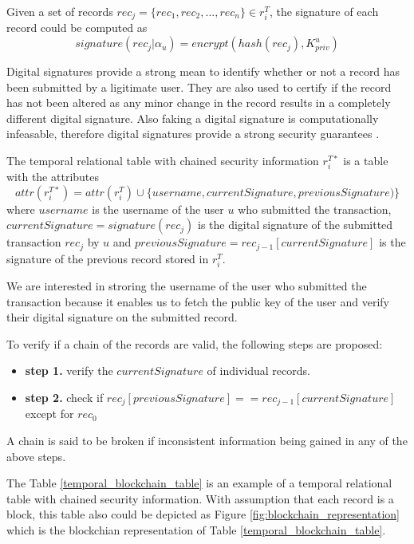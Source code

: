 \begin{defn} 
	Given a set of records $rec_j =\{rec_1,rec_2,...,rec_n\} \in r_i^T$, the signature of each record could be computed as $$signature(rec_j|\alpha_u)= encrypt(hash(rec_j),K_{priv}^u)$$  
\label{defn:digital_signature}
\end{defn}

Digital signatures provide a strong mean to identify whether or not a record has been submitted by a ligitimate user. They are also used to certify if the record has not been altered as any minor change in the record results in a completely different digital signature. Also faking a digital signature is computationally infeasable, therefore digital signatures provide a strong security guarantees \cite{katz2010digital}.

\begin{defn}
	The temporal relational table with chained security information $r_i^{T*}$ is a table with the attributes $$attr(r_i^{T*}) = attr(r_i^T) \cup \{username,currentSignature, previousSignature)\}$$ where $username$ is the username of the user $u$ who submitted the transaction, $currentSignature = signature(rec_j)$ is the digital signature of the submitted transaction $rec_j$ by $u$ and $previousSignature = rec_{j-1}[currentSignature]$ is the signature of the previous record stored in $r_i^T$. 
\label{defn:temporal_blockchain}
\end{defn}

We are interested in stroring the username of the user who submitted the transaction because it enables us to fetch the public key of the user and verify their digital signature on the submitted record.

\begin{defn}
	To verify if a chain of the records are valid, the following steps are proposed:
	\begin{itemize}
		\item \textbf{step 1.} verify the $currentSignature$ of individual records.
		\item \textbf{step 2.} check if $rec_j[previousSignature] == rec_{j-1}[currentSignature]$ except for $rec_0$
	\end{itemize}
\label{chain_verification}
\end{defn}
A chain is said to be broken if inconsistent information being gained in any of the above steps.

\begin{example} 
	The Table \ref{temporal_blockchain_table} is an example of a temporal relational table with chained security information. With assumption that each record is a block, this table also could be depicted as Figure \ref{fig:blockchain_representation} which is the blockchian representation of Table \ref{temporal_blockchain_table}.
\label{example:blockchain}
\end{example}

